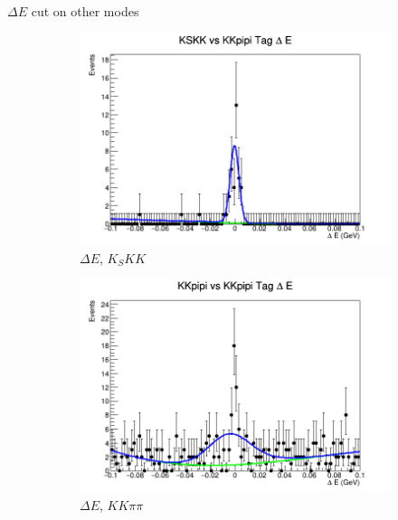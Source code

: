 \documentclass{beamer}
\begin{document}
\begin{frame}{$\Delta E$ cut on other modes}
  \begin{figure}
    \centering
    \begin{subfigure}{0.4\textwidth}
      \centering
      \includegraphics[width=\textwidth]{KSKKTagDeltaE.png}
      \caption{$\Delta E$, $K_SKK$}
    \end{subfigure}%
    \begin{subfigure}{0.4\textwidth}
      \centering
      \includegraphics[width=\textwidth]{KkpipiTagDeltaE.png}
      \caption{$\Delta E$, $KK\pi\pi$}
    \end{subfigure}
    \centering
    \begin{subfigure}{0.4\textwidth}
      \centering

\end{subfigure}
\end{figure}
\end{frame}
\end{document}
